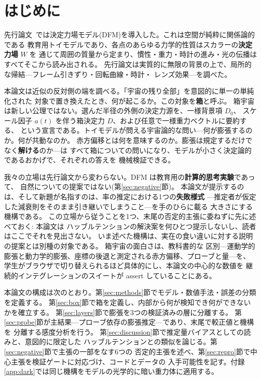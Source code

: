 \documentclass[a4paper,10pt,twocolumn]{ltjsarticle}
\begin{document}
\section{はじめに}
\label{sec:intro}

先行論文~\cite{DFM1}では決定力場モデル(DFM)を導入した。これは空間が純粋に関係論的である
教育用トイモデルであり、各点のあらゆる力学的性質はスカラーの\textbf{決定力場} $W$ を
通じて周囲の質量から定まり、慣性・重力・時計の進み・光の伝播はすべてそこから読み出される。
先行論文は実質的に無限の背景の上で、局所的な帰結---フレーム引きずり・回転曲線・時計・
レンズ効果---を調べた。

本論文は近似の反対側の端を調べる。「宇宙の残り全部」を意図的に単一の単純化された
対象で置き換えたとき、何が起こるか。この対象を\textbf{箱}と呼ぶ。
箱宇宙は新しい公理ではない。選んだ半径の外側の決定力源を、一様背景項 $D_0$、
スケール因子 $a(t)$ を伴う箱決定力 $D$、および任意で一様重力ベクトルに要約する、
という宣言である。トイモデルが問える宇宙論的な問い---何が膨張するのか。何が共動なのか。
赤方偏移とは何を意味するのか。膨張は規定するだけでなく\textbf{解ける}のか---は
すべて箱についての問いになり、モデルが小さく決定論的であるおかげで、それぞれの答えを
機械検証できる。

我々の立場は先行論文から変わらない。DFM は教育用の\textbf{計算的思考実験}であって、
自然についての提案ではない(第\ref{sec:negative}節)。
本論文が提示するのは、そして新題が名指すのは、率の推定における1つの\textbf{失敗様式}
---推定者が仮定した減衰則をそのまま引き継いでしまうこと---を手のひらに載る
大きさにする機構である。
この立場から従うことを1つ、末尾の否定的主張に委ねずに先に述べておく: 本論文は
ハッブルテンションの解決案を何ひとつ提示しないし、読者はここでそれを見出さない。
いま述べた機構は、実在の食い違いに対する説明の提案とは別種の対象である。
箱宇宙の面白さは、教科書的な
区別---運動学的膨張と動力学的膨張、座標の後退と測定される赤方偏移、プローブと量---を、
学生がブラウザで切り替えられるほど具体的にし、本論文の中心的な数値を
継続的インテグレーションのスイートが assert していることにある。

本論文の構成は次のとおり。第\ref{sec:methods}節でモデル・数値手法・誤差の分類を定義する。
第\ref{sec:box}節で箱を定義し、内部から何が検知でき何ができないかを確立する。
第\ref{sec:layers}節で膨張を3つの検証済みの層に分離する。
第\ref{sec:probe}節が主結果---プローブ依存の膨張推定---であり、末尾で較正値と機構を
分離する感度分析を行う。
第\ref{sec:discussion}節で推定量バイアスとしての読みと、意図的に限定した
ハッブルテンションとの類似を論じる。第\ref{sec:negative}節で主張の一部をなす6つの
否定的主張を述べ、第\ref{sec:repro}節で中心主張を検証ゲートに対応づけ、コードとデータの
入手可能性を記す。付録\ref{app:dark}では同じ機構をモデルの光学的に暗い重力体に適用する。
\end{document}
